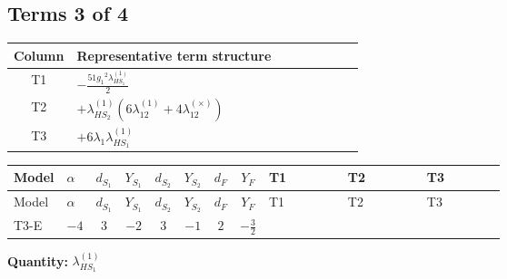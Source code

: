 \documentclass[8pt]{article}
\begin{document}
\begin{landscape}
\subsection*{Terms 3 of 4}
\begin{center}
\begin{tabular}{@{}c >{\raggedright\arraybackslash}p{0.82\linewidth}@{}}
\toprule
Column & Representative term structure \\
\midrule
T1 & \(\displaystyle -\frac{51 {g_1}^2 {\lambda_{HS_1}^{(1)}}}{2}\) \\
\midrule
T2 & \(\displaystyle +{\lambda_{HS_2}^{(1)}} (6 {\lambda_{12}^{(1)}}+4 {\lambda_{12}^{(\times)}})\) \\
\midrule
T3 & \(\displaystyle +6 {\lambda_1} {\lambda_{HS_1}^{(1)}}\) \\
\midrule
\bottomrule
\end{tabular}
\end{center}
\smallskip
\tiny
\begin{longtable}{@{}llcccccc >{\raggedright\arraybackslash}p{0.21\linewidth} >{\raggedright\arraybackslash}p{0.21\linewidth} >{\raggedright\arraybackslash}p{0.21\linewidth}@{}}
\toprule
Model & $\alpha$ & $d_{S_1}$ & $Y_{S_1}$ & $d_{S_2}$ & $Y_{S_2}$ & $d_F$ & $Y_F$ & T1 & T2 & T3 \\
\midrule
\endfirsthead
\toprule
Model & $\alpha$ & $d_{S_1}$ & $Y_{S_1}$ & $d_{S_2}$ & $Y_{S_2}$ & $d_F$ & $Y_F$ & T1 & T2 & T3 \\
\midrule
\endhead
T3-E & $-4$ & $3$ & $-2$ & $3$ & $-1$ & $2$ & $-\frac{3}{2}$ & \scriptsize\adjustbox{max width=\linewidth}{$\begin{gathered} -\frac{51 {g_1}^2 {\lambda_{HS_1}^{(1)}}}{2}\end{gathered}$} & \scriptsize\adjustbox{max width=\linewidth}{$\begin{gathered} +{\lambda_{HS_2}^{(1)}} (6 {\lambda_{12}^{(1)}}+4 {\lambda_{12}^{(\times)}})\end{gathered}$} & \scriptsize\adjustbox{max width=\linewidth}{$\begin{gathered} +6 {\lambda_1} {\lambda_{HS_1}^{(1)}}\end{gathered}$} \\
\midrule
\bottomrule
\end{longtable}
\clearpage
\noindent\textbf{Quantity: }$\lambda_{HS_1}^{(1)}$\par\smallskip

\end{landscape}
\end{document}
